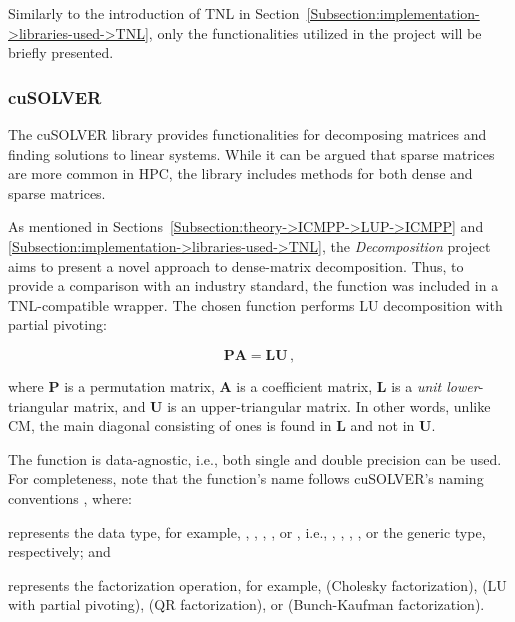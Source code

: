 Similarly to the introduction of TNL in Section~\ref{Subsection:implementation->libraries-used->TNL}, only the functionalities utilized in the project will be briefly presented.

\subsubsection{cuSOLVER}\label{Subsection:implementation->libraries-used->CUDA-libraries->cuSOLVER}
The cuSOLVER library provides functionalities for decomposing matrices and finding solutions to linear systems.
While it can be argued that sparse matrices are more common in HPC, the library includes methods for both dense and sparse matrices.

As mentioned in Sections~\ref{Subsection:theory->ICMPP->LUP->ICMPP} and \ref{Subsection:implementation->libraries-used->TNL}, the \textit{Decomposition} project aims to present a novel approach to dense-matrix decomposition.
Thus, to provide a comparison with an industry standard, the  function was included in a TNL-compatible wrapper.
The chosen function performs LU decomposition with partial pivoting:

\begin{equation}
	\mathbf{PA} = \mathbf{LU} \,,
\end{equation}

where $\mathbf{P}$ is a permutation matrix, $\mathbf{A}$ is a coefficient matrix, $\mathbf{L}$ is a \textit{unit lower}-triangular matrix, and $\mathbf{U}$ is an upper-triangular matrix.
In other words, unlike CM, the main diagonal consisting of ones is found in $\mathbf{L}$ and not in $\mathbf{U}$.

The function is data-agnostic, i.e., both single and double precision can be used.
For completeness, note that the function's name follows cuSOLVER's naming conventions  \cite{5D33zKi5iStCty0r}, where:

\begin{tight_itemize}
	\item {} represents the data type, for example, , , , , or , i.e., , , , , or the generic type, respectively; and
	\item {} represents the factorization operation, for example,  (Cholesky factorization),  (LU with partial pivoting),  (QR factorization), or  (Bunch-Kaufman factorization).
\end{tight_itemize}

